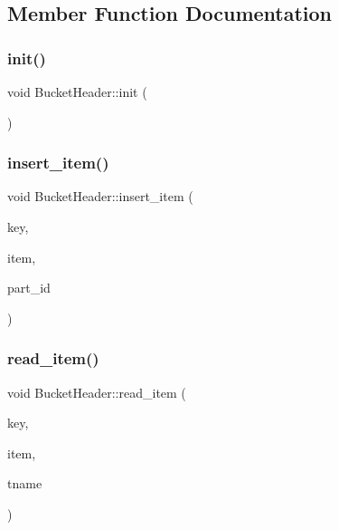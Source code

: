 \subsection{Member Function Documentation}
\mbox{\label{classBucketHeader_af033419413f506161fa21020f830220a}} 
\subsubsection{\texorpdfstring{init()}{init()}}
{\footnotesize\ttfamily void Bucket\+Header\+::init (\begin{DoxyParamCaption}{ }\end{DoxyParamCaption})}

\mbox{\label{classBucketHeader_af83c68acf8763f33c09019407710731c}} 
\subsubsection{\texorpdfstring{insert\+\_\+item()}{insert\_item()}}
{\footnotesize\ttfamily void Bucket\+Header\+::insert\+\_\+item (\begin{DoxyParamCaption}\item[{\hyperlink{index__base_8h_ae35c40bc2f912c11f0e36ac66cba4489}{K\+E\+Y\+\_\+\+T\+Y\+PE}}]{key,  }\item[{\hyperlink{microbench_2main_8cpp_ae17cb099b4c9aee7835032339b5a9e0d}{V\+A\+L\+U\+E\+\_\+\+T\+Y\+PE}}]{item,  }\item[{int}]{part\+\_\+id }\end{DoxyParamCaption})}

\mbox{\label{classBucketHeader_ac626241058ab4e23bbb9827d68078c3f}} 
\subsubsection{\texorpdfstring{read\+\_\+item()}{read\_item()}}
{\footnotesize\ttfamily void Bucket\+Header\+::read\+\_\+item (\begin{DoxyParamCaption}\item[{\hyperlink{index__base_8h_ae35c40bc2f912c11f0e36ac66cba4489}{K\+E\+Y\+\_\+\+T\+Y\+PE}}]{key,  }\item[{\hyperlink{microbench_2main_8cpp_ae17cb099b4c9aee7835032339b5a9e0d}{V\+A\+L\+U\+E\+\_\+\+T\+Y\+PE} $\ast$}]{item,  }\item[{const char $\ast$}]{tname }\end{DoxyParamCaption})}



